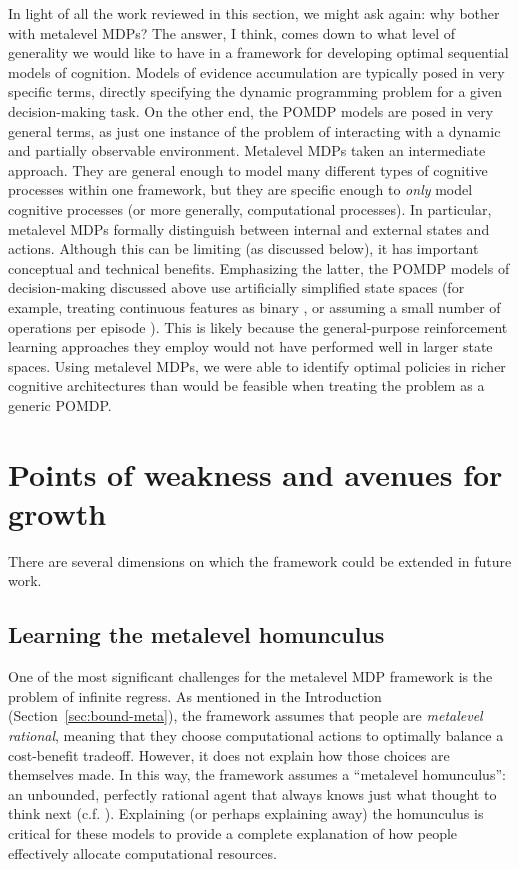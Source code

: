 In light of all the work reviewed in this section, we might ask again: why bother with metalevel MDPs? The answer, I think, comes down to what level of generality we would like to have in a framework for developing optimal sequential models of cognition. Models of evidence accumulation are typically posed in very specific terms, directly specifying the dynamic programming problem for a given decision-making task. On the other end, the POMDP models are posed in very general terms, as just one instance of the problem of interacting with a dynamic and partially observable environment. Metalevel MDPs taken an intermediate approach. They are general enough to model many different types of cognitive processes within one framework, but they are specific enough to \emph{only} model cognitive processes (or more generally, computational processes). In particular, metalevel MDPs formally distinguish between internal and external states and actions. Although this can be limiting (as discussed below), it has important conceptual and technical benefits. Emphasizing the latter, the POMDP models of decision-making discussed above use artificially simplified state spaces (for example, treating continuous features as binary \citealp{chen2017cognitive}, or assuming a small number of operations per episode \citealp{chen2021apparently}). This is likely because the general-purpose reinforcement learning approaches they employ would not have performed well in larger state spaces. Using metalevel MDPs, we were able to identify optimal policies in richer cognitive architectures than would be feasible when treating the problem as a generic POMDP.

\section{Points of weakness and avenues for growth}

There are several dimensions on which the framework could be extended in future work.

\subsection{Learning the metalevel homunculus}\label{sec:homunculus}

One of the most significant challenges for the metalevel MDP framework is the problem of infinite regress. As mentioned in the Introduction (Section~\ref{sec:bound-meta}), the framework assumes that people are \emph{metalevel rational}, meaning that they choose computational actions to optimally balance a cost-benefit tradeoff. However, it does not explain how those choices are themselves made. In this way, the framework assumes a ``metalevel homunculus'': an unbounded, perfectly rational agent that always knows just what thought to think next (c.f. \citealp{hazy2006banishing,botvinick2014computational}). Explaining (or perhaps explaining away) the homunculus is critical for these models to provide a complete explanation of how people effectively allocate computational resources.

